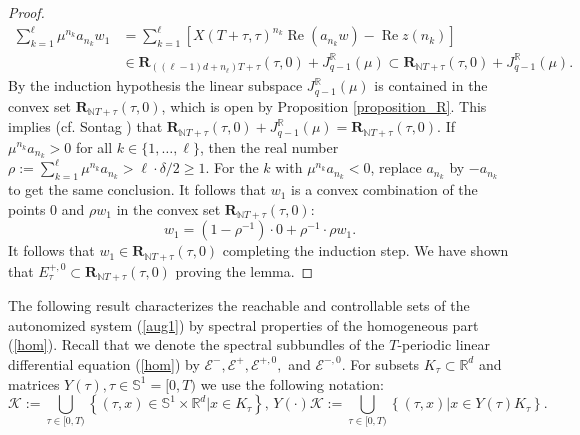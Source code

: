 \documentclass{siamltex}%
\begin{document}
\begin{proof}
\begin{align*}
\sum_{k=1}^{\ell}\mu^{n_{k}}a_{n_{k}}w_{1}  &  =\sum_{k=1}^{\ell}\left[
X(T+\tau,\tau)^{n_{k}}\operatorname{Re}(a_{n_{k}}w)-\operatorname{Re}%
z(n_{k})\right] \\
&  \in\mathbf{R}_{((\ell-1)d+n_{\ell})T+\tau}(\tau,0)+J_{q-1}^{\mathbb{R}}%
(\mu)\subset\mathbf{R}_{\mathbb{N}T+\tau}(\tau,0)+J_{q-1}^{\mathbb{R}}(\mu).
\end{align*}
By the induction hypothesis the linear subspace $J_{q-1}^{\mathbb{R}}(\mu)$ is
contained in the convex set $\mathbf{R}_{\mathbb{N}T+\tau}(\tau,0)$, which is
open by Proposition \ref{proposition_R}. This implies (cf. Sontag \cite[Lemma
3.6.4]{Son98}) that $\mathbf{R}_{\mathbb{N}T+\tau}(\tau,0)+J_{q-1}%
^{\mathbb{R}}(\mu)=\mathbf{R}_{\mathbb{N}T+\tau}(\tau,0)$. If $\mu^{n_{k}%
}a_{n_{k}}>0$ for all $k\in\{1,\dotsc,\ell\}$, then the real number
$\rho:=\sum_{k=1}^{\ell}\mu^{n_{k}}a_{n_{k}}>\ell\cdot\delta/2\geq1$. For the
$k$ with $\mu^{n_{k}}a_{n_{k}}<0$, replace $a_{n_{k}}$ by $-a_{n_{k}}$ to get
the same conclusion. It follows that $w_{1}$ is a convex combination of the
points $0$ and $\rho w_{1}$ in the convex set $\mathbf{R}_{\mathbb{N}T+\tau
}(\tau,0)$:%
\[
w_{1}=\left(  1-\rho^{-1}\right)  \cdot0+\rho^{-1}\cdot\rho w_{1}.
\]
It follows that $w_{1}\in\mathbf{R}_{\mathbb{N}T+\tau}(\tau,0)$ completing the
induction step. We have shown that $E_{\tau}^{+,0}\subset\mathbf{R}%
_{\mathbb{N}T+\tau}(\tau,0)$ proving the lemma.
\end{proof}

The following result characterizes the reachable and controllable sets of the
autonomized system (\ref{aug1}) by spectral properties of the homogeneous part
(\ref{hom}). Recall that we denote the spectral subbundles of the $T$-periodic
linear differential equation (\ref{hom}) by $\mathcal{E}^{-},\mathcal{E}%
^{+},\mathcal{E}^{+,0},$ and $\mathcal{E}^{-,0}$. For subsets $K_{\tau}%
\subset\mathbb{R}^{d}$ and matrices $Y(\tau),\tau\in\mathbb{S}^{1}=[0,T)$ we
use the following notation:%
\[
\mathcal{K}:=\bigcup_{\tau\in\lbrack0,T)}\left\{  (\tau,x)\in\mathbb{S}%
^{1}\times\mathbb{R}^{d}\left\vert x\in K_{\tau}\right.  \right\}
,\,Y(\cdot)\mathcal{K}:=\bigcup_{\tau\in\lbrack0,T)}\left\{  (\tau
,x)\left\vert x\in Y(\tau)K_{\tau}\right.  \right\}  .
\]
\end{document}
